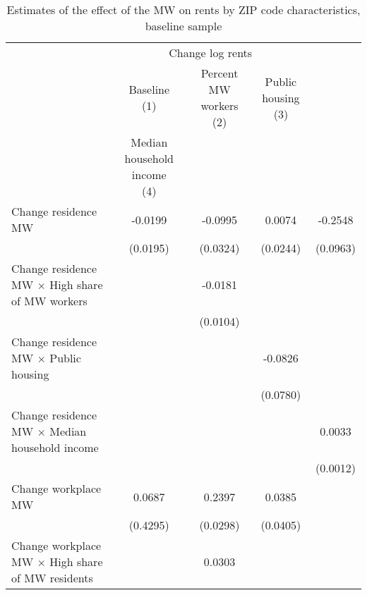 \begin{table}[hbt!] \centering
    \caption{Estimates of the effect of the MW on rents by ZIP code characteristics, baseline sample}
    \label{tab:heterogeneity}
    \begin{tabular}{@{}lcccc@{}}
        \toprule
            & \multicolumn{3}{c}{Change log rents}                                                  \\ \cmidrule(l){2-4} 
            & \shortstack{Baseline\\(1)} 
            & \shortstack{Percent MW workers\\(2)}                                             
            & \shortstack{Public housing\\(3)}                                                      \\
            & \shortstack{Median household income \\(4)}                             \\ \midrule
        Change residence MW                                     &  -0.0199   &  -0.0995  &  0.0074   &  -0.2548   \\
                                                                & (0.0195)  & (0.0324) & (0.0244)  & (0.0963)  \\
        Change residence MW $\times$ High share of MW workers   &        &  -0.0181  &        &        \\
                                                                &        & (0.0104) &        &        \\
        Change residence MW $\times$ Public housing             &        &       &  -0.0826   &        \\
                                                                &        &       & (0.0780)  &        \\
        Change residence MW $\times$ Median household income    &        &       &        &  0.0033   \\
                                                                &        &       &        & (0.0012)  \\
        Change workplace MW                                     &  0.0687   &  0.2397  &  0.0385   &        \\
                                                                & (0.4295)  & (0.0298) & (0.0405)  &        \\
        Change workplace MW $\times$ High share of MW residents &        &  0.0303  &        &        \\

\end{tabular}
\end{table}
